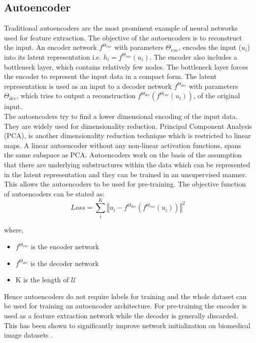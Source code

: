 \subsection{Autoencoder}
Traditional autoencoders\cite{kramer1991} are the most prominent example of neural networks used for feature extraction. The objective of the autoencoders is to reconstruct the input. An encoder network $f^{\Theta_{enc}}$ with parameters $\Theta_{enc}$, encodes the input ($u_i$) into its latent representation i.e. $h_i = f^{\Theta_{enc}}(u_i)$. The encoder also includes a bottleneck layer, which contains relatively few nodes. The bottleneck layer forces the encoder to represent the input data in a compact form. The latent representation is used as an input to a decoder network $f^{\Theta_{dec}}$ with parameters $\Theta_{dec}$, which tries to output a reconstruction $f^{\Theta_{dec}}(f^{\Theta_{enc}}(u_i))$, of the original input. \\
The autoencoders try to find a lower dimensional encoding of the input data. They are widely used for dimensionality reduction. Principal Component Analysis (PCA), is another dimensionality reduction technique which is restricted to linear maps. A linear autoencoder without any non-linear activation functions, spans the same subspace as PCA\cite{baldi1989}. Autoencoders work on the basis of the assumption that there are underlying substructures within the data which can be represented in the latent representation and they can be trained in an unsupervised manner. This allows the autoencoders to be used for pre-training.
The objective function of autoencoders can be stated as:
\begin{equation}
    \label{equation:autoencoders_loss}
    Loss = \sum_{i}^{K} \left\Vert u_i - f^{\Theta_{dec}}(f^{\Theta_{enc}}(u_i)) \right\Vert^2
\end{equation}

where,
\begin{itemize}[label={}]
  \setlength\itemsep{0em}
  \item $f^{\Theta_{enc}}$ is the encoder network
  \item $f^{\Theta_{dec}}$ is the decoder network
  \item K is the length of $\mathcal{U}$
\end{itemize}

Hence autoencoders do not require labels for training and the whole dataset can be used for training an autoencoder architecture. For pre-training the encoder is used as a feature extraction network while the decoder is generally discarded. This has been shown to significantly improve network initialization on biomedical image datasets \cite{ferreira2020}.

